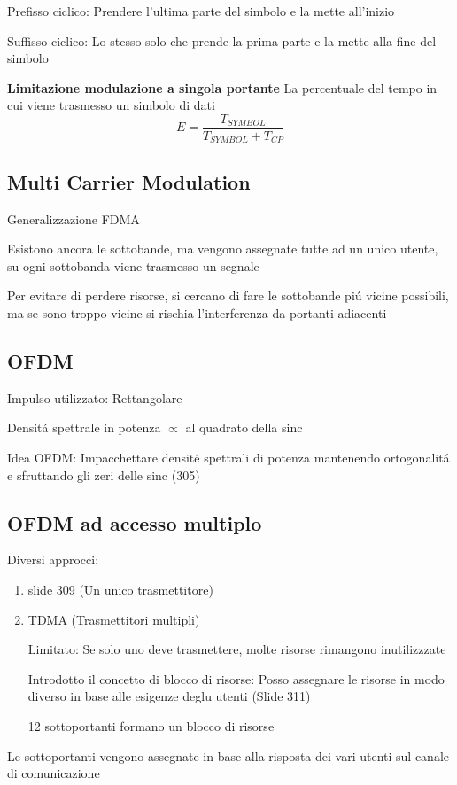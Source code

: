 \documentclass{article}
\begin{document}
Prefisso ciclico: Prendere l'ultima parte del simbolo e la mette all'inizio

Suffisso ciclico: Lo stesso solo che prende la prima parte e la mette alla fine del simbolo

\textbf{Limitazione modulazione a singola portante}
La percentuale del tempo in cui viene trasmesso un simbolo di dati
\[ E = \frac{T_{SYMBOL}}{T_{SYMBOL} + T_{CP}} \]

\subsection{Multi Carrier Modulation}

Generalizzazione FDMA

Esistono ancora le sottobande, ma vengono assegnate tutte ad un unico utente, su ogni sottobanda viene trasmesso un segnale

Per evitare di perdere risorse, si cercano di fare le sottobande pi\'u vicine possibili, ma se sono troppo vicine si rischia l'interferenza da portanti adiacenti

\subsection{OFDM}
Impulso utilizzato: Rettangolare

Densit\'a spettrale in potenza $\propto$ al quadrato della sinc

Idea OFDM: Impacchettare densit\'e spettrali di potenza mantenendo ortogonalit\'a e sfruttando gli zeri delle sinc (305)


\subsection{OFDM ad accesso multiplo}

Diversi approcci:
\begin{enumerate}
    \item slide 309 (Un unico trasmettitore)
    \item TDMA (Trasmettitori multipli)

        Limitato:
        Se solo uno deve trasmettere, molte risorse rimangono inutilizzzate

        Introdotto il concetto di blocco di risorse:
        Posso assegnare le risorse in modo diverso in base alle esigenze deglu utenti (Slide 311)

        12 sottoportanti formano un blocco di risorse

\end{enumerate}
Le sottoportanti vengono assegnate in base alla risposta dei vari utenti sul canale di comunicazione
\end{document}
